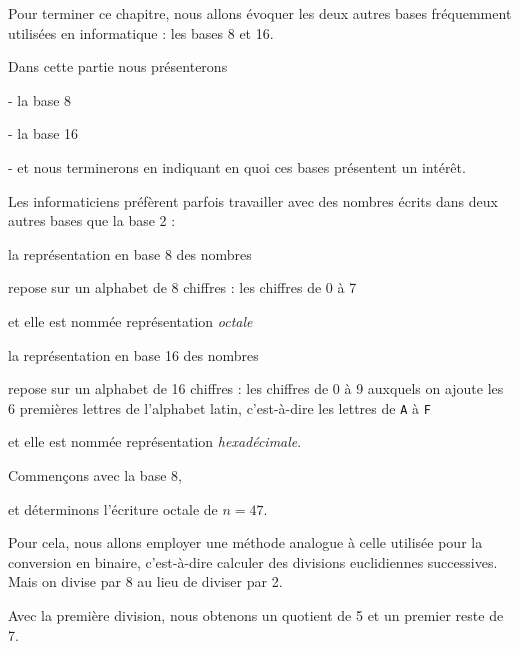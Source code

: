 




\debuttexte

\diapo %
Pour terminer ce chapitre, nous allons évoquer les deux autres bases fréquemment utilisées en informatique : les bases 8 et 16.

\change

Dans cette partie nous présenterons

\change
- la base 8

\change
- la base 16

\change
- et nous terminerons en indiquant en quoi ces bases présentent un intérêt.

\diapo %

\change
Les informaticiens préfèrent parfois  travailler avec des nombres écrits dans deux autres bases que la base 2 :

\change
la représentation en base 8 des nombres

\change
repose sur un alphabet de 8 chiffres : les chiffres de 0 à 7

\change
et elle est nommée représentation \emph{octale}
 
\change
la représentation en base 16 des nombres

\change
repose sur un alphabet de 16 chiffres : les chiffres de 0 à 9 auxquels on ajoute les 6 premières lettres de l'alphabet latin, c'est-à-dire les lettres de \texttt{A} à \texttt{F}

\change
et elle est nommée représentation \emph{hexadécimale}.

\diapo %

Commençons avec la base 8,

\change
et déterminons l'écriture octale de $n=47$.

\change
Pour cela, nous allons employer une méthode analogue à celle utilisée pour la conversion en binaire, c'est-à-dire calculer des divisions euclidiennes successives. Mais on divise par 8 au lieu de diviser par 2.

Avec la première division, nous obtenons un quotient de 5 et un premier reste de 7.

